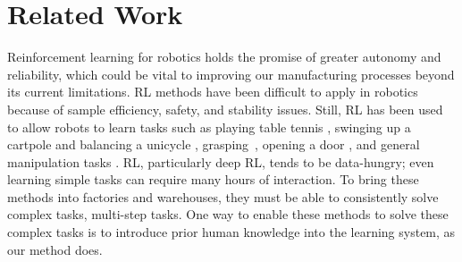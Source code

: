 \section{Related Work}\label{sec:related_work}

Reinforcement learning for robotics holds the promise of greater autonomy and reliability, which could be vital to improving our manufacturing processes beyond its current limitations.
RL methods have been difficult to apply in robotics because of sample efficiency, safety, and stability issues. Still, RL has been used to allow robots to learn tasks such as playing table tennis \cite{peters2010reps}, swinging up a cartpole and balancing a unicycle \cite{deisenroth2011pilco}, grasping~\cite{pinto2017robust, levine2017grasping}, opening a door \cite{Gu2016b}, and general manipulation tasks \cite{levine2016gps, haarnoja2018sac}. RL, particularly deep RL, tends to be data-hungry; even learning simple tasks can require many hours of interaction. To bring these methods into factories and warehouses, they must be able to consistently solve complex tasks, multi-step tasks. One way to enable these methods to solve these complex tasks is to introduce prior human knowledge into the learning system, as our method does.

